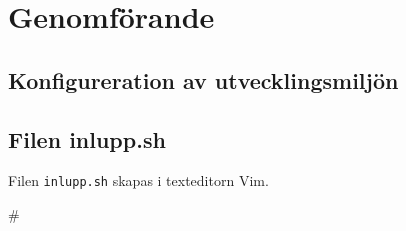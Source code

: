 %


\section{Genomförande}


\subsection{Konfigureration av utvecklingsmiljön}
% 
%   
%



\subsection{Filen inlupp.sh}
Filen \texttt{inlupp.sh} skapas i texteditorn Vim.




#\inputminted{bash}{../src/inlupp.sh}
